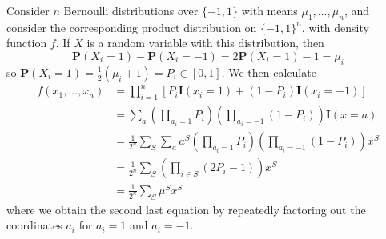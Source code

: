 \begin{example}
    Consider $n$ Bernoulli distributions over $\{ -1, 1 \}$ with means $\mu_1, \dots, \mu_n$, and consider the corresponding product distribution on $\{ -1, 1 \}^n$, with density function $f$. If $X$ is a random variable with this distribution, then
    \[ \mathbf{P}(X_i = 1) - \mathbf{P}(X_i = -1) = 2 \mathbf{P}(X_i = 1) - 1 = \mu_i \]
    so $\mathbf{P}(X_i = 1) = \frac{1}{2} (\mu_i + 1) = P_i \in [0,1]$. We then calculate
    \begin{align*}
        f(x_1, \dots, x_n) &= \prod_{i = 1}^n \left[ P_i \mathbf{I}(x_i = 1) + (1 - P_i) \mathbf{I}(x_i = -1) \right]\\
        &= \sum_a \left( \prod_{a_i = 1} P_i \right) \left( \prod_{a_i = -1} (1 - P_i) \right) \mathbf{I}(x = a)\\
        &= \frac{1}{2^n} \sum_S \sum_a a^S \left( \prod_{a_i = 1} P_i \right) \left( \prod_{a_i = -1} (1 - P_i) \right) x^S\\
        &= \frac{1}{2^n} \sum_S \left( \prod_{i \in S} (2P_i - 1) \right) x^S\\
        &= \frac{1}{2^n} \sum_S \mu^S x^S
    \end{align*}
    where we obtain the second last equation by repeatedly factoring out the coordinates $a_i$ for $a_i = 1$ and $a_i = -1$.
\end{example}

